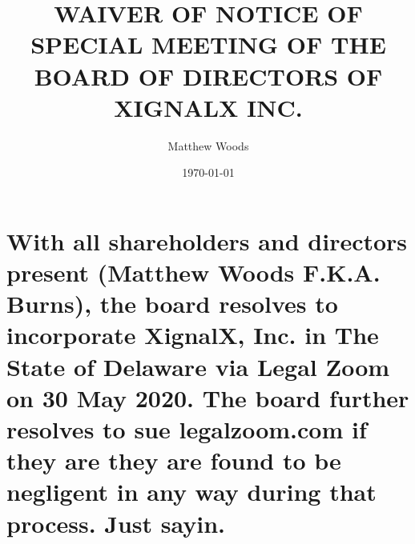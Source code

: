 \documentclass{article}
\title{WAIVER OF NOTICE OF SPECIAL MEETING OF THE BOARD OF DIRECTORS OF XIGNALX INC.}
\author{Matthew Woods}
\date{\today}
\begin{document}
\maketitle

\section{With all shareholders and directors present (Matthew Woods F.K.A. Burns), the board resolves to incorporate XignalX, Inc. in The State of Delaware via Legal Zoom on 30 May 2020. The board further resolves to sue legalzoom.com if they are they are found to be negligent in any way during that process. Just sayin.}
\end{document}
